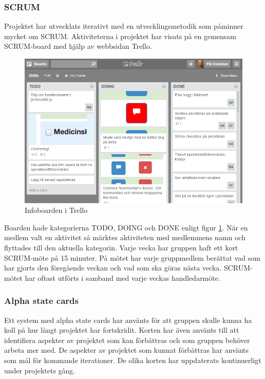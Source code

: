 \documentclass{article}
\begin{document}
\subsubsection{SCRUM}
Projektet har utvecklats iterativt med en utvecklingsmetodik som påminner mycket om SCRUM. Aktiviteterna i projektet har visats på en gemensam SCRUM-board med hjälp av webbsidan Trello. 

\begin{figure}[htbp]
	\begin{center}
	\includegraphics[scale=0.5]{trello2.png}
	\caption{Infoboarden i Trello}
	\label{fig:trello2}
	\end{center}
\end{figure}

Boarden hade kategorierna TODO, DOING och DONE enligt figur \ref{fig:trello2}. När en medlem valt en aktivitet så märktes aktiviteten med medlemmens namn och flyttades till den aktuella kategorin. Varje vecka har gruppen haft ett kort SCRUM-möte på 15 minuter. På mötet har varje gruppmedlem berättat vad som har gjorts den föregående veckan och vad som ska göras nästa vecka. SCRUM-mötet har oftast utförts i samband med varje veckas handledarmöte.

\subsubsection{Alpha state cards}
Ett system med alpha state cards har använts för att gruppen skulle kunna ha koll på hur långt projektet har fortskridit. Korten har även använts till att identifiera aspekter av projektet som kan förbättras och som gruppen behöver arbeta mer med. De aspekter av projektet som kunnat förbättras har använts som mål för kommande iterationer. De olika korten har uppdaterats kontinuerligt under projektets gång.
\end{document}
